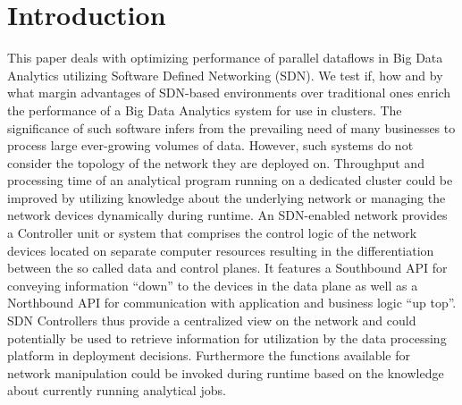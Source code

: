 \section{Introduction}
This paper deals with optimizing performance of parallel dataflows in Big Data Analytics utilizing
Software Defined Networking (SDN). We test if, how and by what margin advantages of SDN-based
environments over traditional ones enrich the performance of a Big Data Analytics system for use in
clusters. The significance of such software infers from the prevailing need of many businesses to
process large ever-growing volumes of data. However, such systems do not consider the topology of
the network they are deployed on. Throughput and processing time of an analytical program running on
a dedicated cluster could be improved by utilizing knowledge about the underlying network or
managing the network devices dynamically during runtime. An SDN-enabled network provides a
Controller unit or system that comprises the control logic of the network devices located on
separate computer resources resulting in the differentiation between the so called data and control
planes. It features a Southbound API for conveying information “down” to the devices in the data
plane as well as a Northbound API for communication with application and business logic “up top”.
SDN Controllers thus provide a centralized view on the network and could potentially be used to
retrieve information for utilization by the data processing platform in deployment decisions.
Furthermore the functions available for network manipulation could be invoked during runtime based
on the knowledge about currently running analytical jobs.
